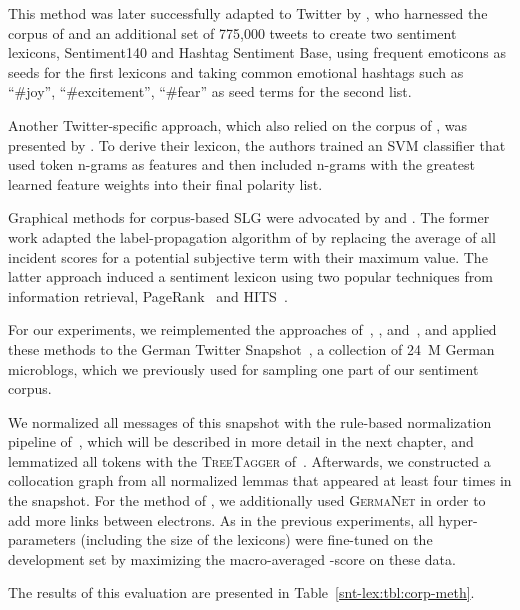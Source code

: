 This method was later successfully adapted to Twitter by
\citet{Kiritchenko:14}, who harnessed the corpus of \citet{Go:09} and
an additional set of 775,000 tweets to create two sentiment lexicons,
Sentiment140 and Hashtag Sentiment Base, using frequent emoticons as
seeds for the first lexicons and taking common emotional hashtags such
as ``\#joy'', ``\#excitement'', ``\#fear'' as seed terms for the
second list.

Another Twitter-specific approach, which also relied on the corpus of
\citet{Go:09}, was presented by \citet{Severyn:15a}.  To derive their
lexicon, the authors trained an SVM classifier that used token n-grams
as features and then included n-grams with the greatest learned
feature weights into their final polarity list.

Graphical methods for corpus-based SLG were advocated by
\citet{Velikovich:10} and \citet{Feng:11}.  The former work adapted
the label-propagation algorithm of \citet{Rao:09} by replacing the
average of all incident scores for a potential subjective term with
their maximum value.  The latter approach induced a sentiment lexicon
using two popular techniques from information retrieval,
PageRank~\cite{Brin:98} and HITS~\cite{Kleinberg:99}.

For our experiments, we reimplemented the approaches
of~\citet{Takamura:05}, \citet{Velikovich:10}, \citet{Kiritchenko:14}
and~\citet{Severyn:15}, and applied these methods to the German
Twitter Snapshot~\cite{Scheffler:14}, a collection of 24~M German
microblogs, which we previously used for sampling one part of our
sentiment corpus.

We normalized all messages of this snapshot with the rule-based
normalization pipeline of~\citet{Sidarenka:13}, which will be
described in more detail in the next chapter, and lemmatized all
tokens with the \textsc{TreeTagger} of~\citet{Schmid:95}.  Afterwards,
we constructed a collocation graph from all normalized lemmas that
appeared at least four times in the snapshot.  For the method of
\citet{Takamura:05}, we additionally used \textsc{GermaNet} in order
to add more links between electrons.  As in the previous experiments,
all hyper-parameters (including the size of the lexicons) were
fine-tuned on the development set by maximizing the macro-averaged
\F{}-score on these data.

The results of this evaluation are presented in
Table~\ref{snt-lex:tbl:corp-meth}.


